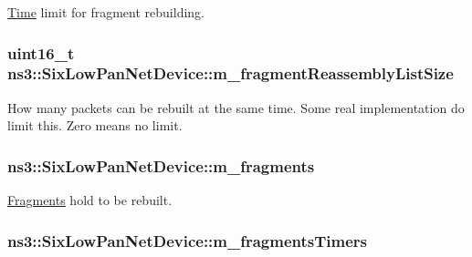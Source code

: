 \hyperlink{classns3_1_1Time}{Time} limit for fragment rebuilding. 

\subsubsection[{\texorpdfstring{m\+\_\+fragment\+Reassembly\+List\+Size}{m_fragmentReassemblyListSize}}]{\setlength{\rightskip}{0pt plus 5cm}uint16\+\_\+t ns3\+::\+Six\+Low\+Pan\+Net\+Device\+::m\+\_\+fragment\+Reassembly\+List\+Size\hspace{0.3cm}{\ttfamily [private]}}\hypertarget{classns3_1_1SixLowPanNetDevice_acf2402dc29d4865287993a508b74c855}{}\label{classns3_1_1SixLowPanNetDevice_acf2402dc29d4865287993a508b74c855}


How many packets can be rebuilt at the same time. Some real implementation do limit this. Zero means no limit. 

\subsubsection[{\texorpdfstring{m\+\_\+fragments}{m_fragments}}]{ ns3\+::\+Six\+Low\+Pan\+Net\+Device\+::m\+\_\+fragments\hspace{0.3cm}{\ttfamily [private]}}\hypertarget{classns3_1_1SixLowPanNetDevice_aed9787c7dcee491945b752d0baa69d09}{}\label{classns3_1_1SixLowPanNetDevice_aed9787c7dcee491945b752d0baa69d09}


\hyperlink{classns3_1_1SixLowPanNetDevice_1_1Fragments}{Fragments} hold to be rebuilt. 

\subsubsection[{\texorpdfstring{m\+\_\+fragments\+Timers}{m_fragmentsTimers}}]{ ns3\+::\+Six\+Low\+Pan\+Net\+Device\+::m\+\_\+fragments\+Timers\hspace{0.3cm}{\ttfamily [private]}}\hypertarget{classns3_1_1SixLowPanNetDevice_ac1f25bfd21a90f1419db0ecf1ea82547}{}\label{classns3_1_1SixLowPanNetDevice_ac1f25bfd21a90f1419db0ecf1ea82547}


